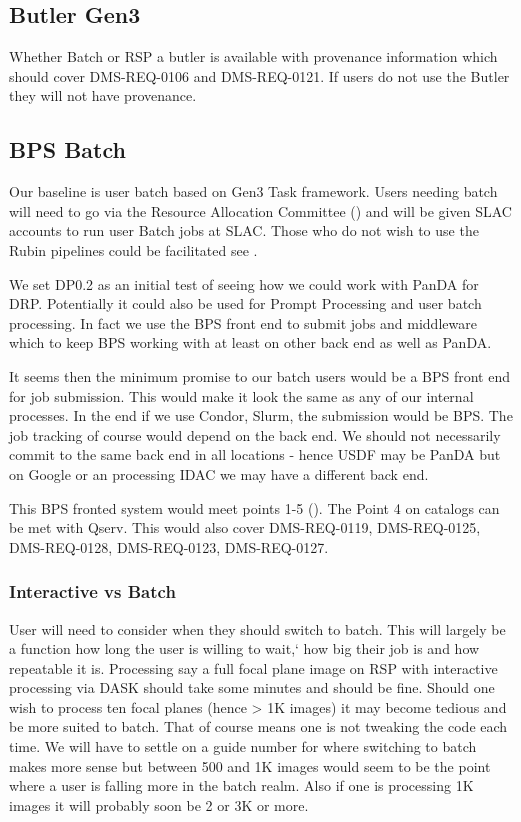 \subsection{Butler Gen3} \label{sec:gen3}

Whether Batch or RSP a butler is available with provenance information which should cover DMS-REQ-0106 and DMS-REQ-0121.
If users do not use the Butler they will not have provenance.

\subsection{BPS Batch }\label{sec:bpsbatch}

Our baseline is user batch based on Gen3 Task framework.
Users needing batch will need to go via the Resource Allocation Committee () and
will be given SLAC accounts to run user Batch jobs at SLAC.
Those who do not wish to use the Rubin pipelines could be facilitated see .


We set DP0.2 as an initial test of seeing how we could work with PanDA 
for DRP. Potentially it could also be used for Prompt Processing and user batch processing.
In fact we use the BPS front end to submit jobs and middleware which to keep BPS working with at least on other back end as well as PanDA.

It seems then the minimum promise to our batch users would be a BPS front end for job submission.
This would make it look the same as any of our internal processes.
In the end if we use Condor, Slurm, the submission would be BPS.
The job tracking of course would depend on the back end.
We should not necessarily commit to the same back end in all locations - hence USDF may be PanDA but on Google or an processing IDAC we may have a different back end.

This BPS fronted system would meet  points 1-5 (). The Point 4 on catalogs can be met with Qserv.
This would also cover DMS-REQ-0119, DMS-REQ-0125, DMS-REQ-0128, DMS-REQ-0123, DMS-REQ-0127.

\subsubsection{Interactive vs Batch} \label{sec:interactivevbatch}
User will need to consider when they should switch to batch.
This will largely be a function how long the user is willing to wait,` how big their job is and how repeatable it is.
Processing say a full focal plane image on RSP with interactive processing via DASK should take some minutes and should be fine.
Should one wish to process ten focal planes (hence > 1K images)  it may become tedious and be more suited to batch.
That of course means  one is not tweaking the code each time.
We will have to settle on a guide number for where switching to batch makes more sense but between 500 and 1K images would
seem to be the point where a user is falling more in the batch realm.
Also if one is processing 1K images it will probably soon be 2 or 3K or more.



